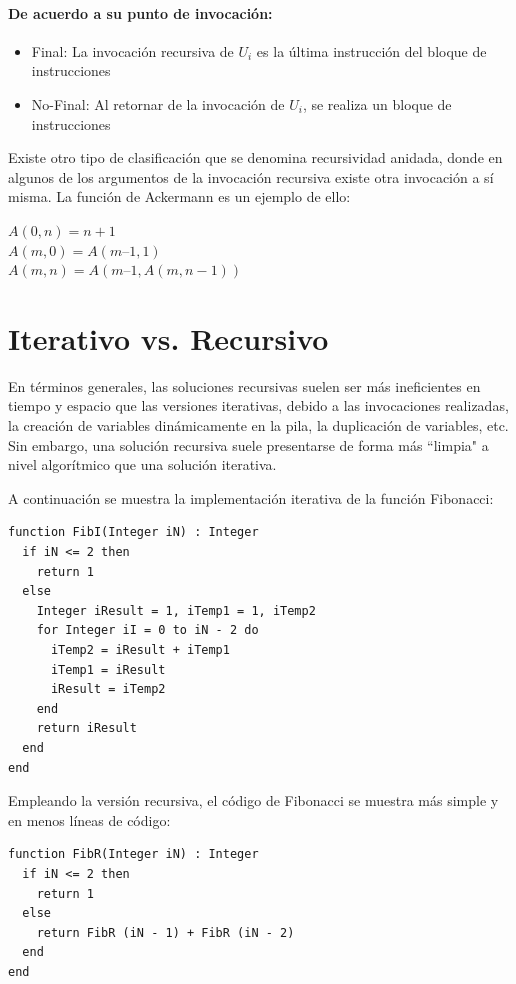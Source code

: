 \paragraph{De acuerdo a su punto de invocación:}
\begin{itemize}
\item Final: La invocación recursiva de $U_i$ es la última instrucción del bloque de instrucciones
\item No-Final: Al retornar de la invocación de $U_i$, se realiza un bloque de instrucciones
\end{itemize}

Existe otro tipo de clasificación que se denomina recursividad anidada, donde en algunos de los argumentos de la invocación recursiva existe otra invocación a sí misma. La función de Ackermann es un ejemplo de ello:

$A(0 , n) = n + 1$ \\
$A(m , 0) = A(m – 1 , 1)$ \\
$A(m , n) = A(m – 1 , A(m , n-1))$ 

\section{Iterativo vs. Recursivo}

En términos generales, las soluciones recursivas suelen ser más ineficientes en tiempo y espacio que las versiones iterativas, debido a las invocaciones realizadas, la creación de variables dinámicamente en la pila, la duplicación de variables, etc. Sin embargo, una solución recursiva suele presentarse de forma más ``limpia" a nivel algorítmico que una solución iterativa.

A continuación se muestra la implementación iterativa de la función Fibonacci:

\begin{lstlisting}[upquote=true, language=pseudo]
function FibI(Integer iN) : Integer
  if iN <= 2 then
	return 1
  else
    Integer iResult = 1, iTemp1 = 1, iTemp2
    for Integer iI = 0 to iN - 2 do
      iTemp2 = iResult + iTemp1
      iTemp1 = iResult
      iResult = iTemp2
    end
    return iResult
  end
end
\end{lstlisting}

Empleando la versión recursiva, el código de Fibonacci se muestra más simple y en menos líneas de código:

\begin{lstlisting}[upquote=true, language=pseudo]
function FibR(Integer iN) : Integer
  if iN <= 2 then
	return 1
  else
    return FibR (iN - 1) + FibR (iN - 2)
  end
end
\end{lstlisting}

